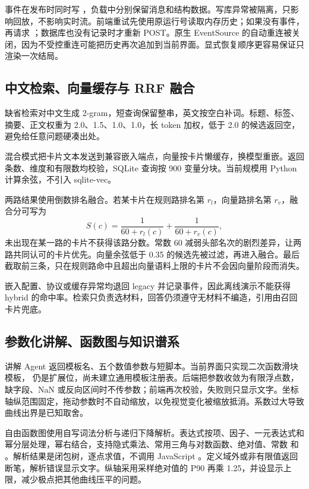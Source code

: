 事件在发布时同时写 ，负载中分别保留消息和结构数据。写库异常被隔离，只影响回放，不影响实时流。前端重试先使用原运行号读取内存历史；如果没有事件，再请求 ；数据库也没有记录时才重新 POST。原生 EventSource 的自动重连被关闭，因为不受控重连可能把历史再次追加到当前界面。显式恢复顺序更容易保证只渲染一次结局。

\subsection{中文检索、向量缓存与 RRF 融合}

缺省检索对中文生成 2-gram，短查询保留整串，英文按空白补词。标题、标签、摘要、正文权重为 2.0、1.5、1.0、1.0，长 token 加权，低于 2.0 的候选返回空，避免给任意问题硬凑出处。

混合模式把卡片文本发送到兼容嵌入端点，向量按卡片懒缓存，换模型重嵌。返回条数、维度和有限数均校验，SQLite 查询按 900 变量分块。当前规模用 Python 计算余弦，不引入 sqlite-vec。

两路结果使用倒数排名融合。若某卡片在规则路排名第 \(r_l\)，向量路排名第 \(r_v\)，融合分可写为
\[
  S(c)=\frac{1}{60+r_l(c)}+\frac{1}{60+r_v(c)},
\]
未出现在某一路的卡片不获得该路分数。常数 60 减弱头部名次的剧烈差异，让两路共同认可的卡片优先。向量余弦低于 0.35 的候选先被过滤，再进入融合。最后截取前三条，只在规则路命中且超出向量语料上限的卡片不会因向量阶段而消失。

嵌入配置、协议或缓存异常均退回 legacy 并记录事件，因此离线演示不能获得 hybrid 的命中率。检索只负责选材料，回答仍须遵守无材料不编造，引用由召回卡片兜底。

\subsection{参数化讲解、函数图与知识谱系}

讲解 Agent 返回模板名、五个数值参数与短脚本。当前界面只实现二次函数滑块模板， 仍是扩展位，尚未建立通用模板注册表。后端把参数收敛为有限浮点数，缺字段、NaN 或反向区间时不传参数；前端再次校验，失败则只显示文字。坐标轴纵范围固定，拖动参数时不自动缩放，以免视觉变化被缩放抵消。系数过大导致曲线出界是已知取舍。

自由函数图使用自写词法分析与递归下降解析。表达式按项、因子、一元表达式和幂分层处理，幂右结合，支持隐式乘法、常用三角与对数函数、绝对值、常数  和 。解析结果是闭包树，逐点求值，不调用 JavaScript 。定义域外或非有限值返回断笔，解析错误显示文字。纵轴采用采样绝对值的 P90 再乘 1.25，并设显示上限，减少极点把其他曲线压平的问题。

